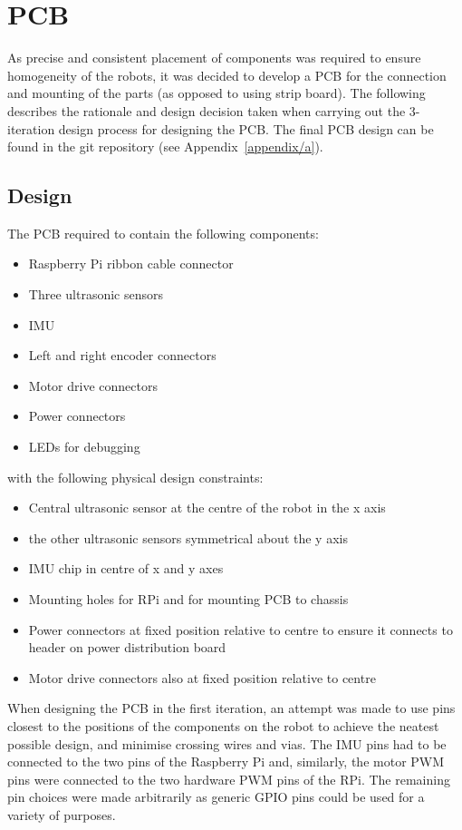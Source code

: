 \section{PCB}\label{elec/pcb}
As precise and consistent placement of components was required to ensure homogeneity of the robots, it was decided to develop a PCB for the connection and mounting of the parts (as opposed to using strip board). The following describes the rationale and design decision taken when carrying out the 3-iteration design process for designing the PCB. The final PCB design can be found in the git repository (see Appendix~\ref{appendix/a}).

\subsection{Design}\label{elec/pcb/design}
The PCB required to contain the following components:
\begin{itemize}
  \item Raspberry Pi ribbon cable connector
  \item Three ultrasonic sensors
  \item IMU
  \item Left and right encoder connectors
  \item Motor drive connectors
  \item Power connectors
  \item LEDs for debugging
\end{itemize}

with the following physical design constraints:

\begin{itemize}
  \item Central ultrasonic sensor at the centre of the robot in the x axis
  \item the other ultrasonic sensors symmetrical about the y axis
  \item IMU chip in centre of x and y axes
  \item Mounting holes for RPi and for mounting PCB to chassis
  \item Power connectors at fixed position relative to centre to ensure it connects to header on power distribution board
  \item Motor drive connectors also at fixed position relative to centre
\end{itemize}


When designing the PCB in 
the first iteration, an attempt was made to use pins closest to the positions of the components on the robot to achieve the neatest possible design, and minimise 
crossing wires and vias. The IMU pins had to be connected to the two \isc{} 
pins of the Raspberry Pi and, similarly, the motor PWM pins were 
connected to the two hardware PWM pins of the RPi. The remaining pin choices were made arbitrarily as generic GPIO pins could be used for a variety of purposes.

